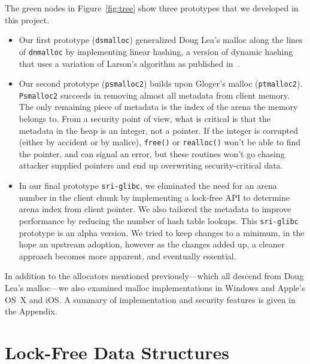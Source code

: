 \documentclass[12pt]{cslreport}
\begin{document}
The green nodes in Figure~\ref{fig:tree} show three prototypes that we
developed in this project.
\begin{itemize}
\item Our first prototype (\texttt{dsmalloc}) generalized Doug Lea's
  malloc along the lines of \texttt{dnmalloc} by implementing linear
  hashing, a version of dynamic hashing that uses a variation of
  Larson's algorithm as published in~\cite{Larson:1988:DHT}.

\item Our second prototype (\texttt{psmalloc2}) builds upon Gloger's malloc (\texttt{ptmalloc2}).
\texttt{Psmalloc2} succeeds in removing almost all metadata from 
client memory. The only remaining piece of metadata is the index of the arena
the memory belongs to.
From a security point of view, what is critical is that the metadata
in the heap is an integer, not a pointer. If the integer is corrupted
(either by accident or by malice), \texttt{free()} or
\texttt{realloc()} won't be able to find the pointer, and can signal
an error, but these routines won't go chasing attacker supplied
pointers and end up overwriting security-critical data.
  
\item In our final prototype \texttt{sri-glibc}, we eliminated the need for
an arena number in the client chunk by implementing a lock-free API to
determine arena index from client pointer. We also tailored the
metadata to improve performance by reducing the number of hash table
lookups.  This \texttt{sri-glibc} prototype is an alpha version. We
tried to keep changes to a minimum, in the hope an upstream adoption,
however as the changes added up, a cleaner approach becomes more
apparent, and eventually essential.
\end{itemize}

In addition to the allocators mentioned previously---which all descend
from Doug Lea's malloc---we also examined malloc implementations in
Windows and Apple's OS~X and iOS. A summary of implementation and
security features is given in the Appendix.


\section{Lock-Free Data Structures}
\label{lock-free}
\end{document}
